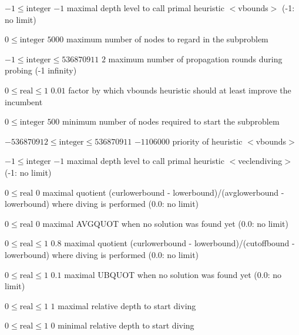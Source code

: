%
{$-1\leq\textrm{integer}$}%
{$-1$}%
{maximal depth level to call primal heuristic $<$vbounds$>$ (-1: no limit)}%
{}

%
{$0\leq\textrm{integer}$}%
{$5000$}%
{maximum number of nodes to regard in the subproblem}%
{}

%
{$-1\leq\textrm{integer}\leq536870911$}%
{$2$}%
{maximum number of propagation rounds during probing (-1 infinity)}%
{}

%
{$0\leq\textrm{real}\leq1$}%
{$0.01$}%
{factor by which vbounds heuristic should at least improve the incumbent  }%
{}

%
{$0\leq\textrm{integer}$}%
{$500$}%
{minimum number of nodes required to start the subproblem}%
{}

%
{$-536870912\leq\textrm{integer}\leq536870911$}%
{$-1106000$}%
{priority of heuristic $<$vbounds$>$}%
{}

%
{$-1\leq\textrm{integer}$}%
{$-1$}%
{maximal depth level to call primal heuristic $<$veclendiving$>$ (-1: no limit)}%
{}

%
{$0\leq\textrm{real}$}%
{$0$}%
{maximal quotient (curlowerbound - lowerbound)/(avglowerbound - lowerbound) where diving is performed (0.0: no limit)}%
{}

%
{$0\leq\textrm{real}$}%
{$0$}%
{maximal AVGQUOT when no solution was found yet (0.0: no limit)}%
{}

%
{$0\leq\textrm{real}\leq1$}%
{$0.8$}%
{maximal quotient (curlowerbound - lowerbound)/(cutoffbound - lowerbound) where diving is performed (0.0: no limit)}%
{}

%
{$0\leq\textrm{real}\leq1$}%
{$0.1$}%
{maximal UBQUOT when no solution was found yet (0.0: no limit)}%
{}

%
{$0\leq\textrm{real}\leq1$}%
{$1$}%
{maximal relative depth to start diving}%
{}

%
{$0\leq\textrm{real}\leq1$}%
{$0$}%
{minimal relative depth to start diving}%
{}

